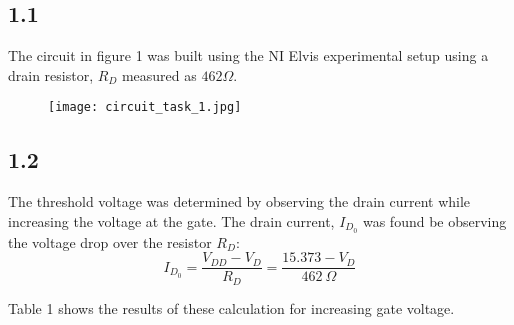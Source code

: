 \subsection*{1.1}
The circuit in figure 1 was built using the NI Elvis experimental setup using a drain resistor, $R_D$ measured as $462 \Omega$.

    \begin{figure}[h!]
        \centering
        \texttt{[image: circuit\_task\_1.jpg]}
    \end{figure}

\subsection*{1.2}
The threshold voltage was determined by observing the drain current while increasing the voltage at the gate. The drain current, $I_{D_0}$ was found be observing the voltage drop over the resistor $R_D$: $$I_{D_0} = \dfrac{V_{DD}-V_D}{R_D} = \dfrac{15.373 - V_D}{462 \ \Omega}$$ 

Table 1 shows the results of these calculation for increasing gate voltage. 

\pagebreak


